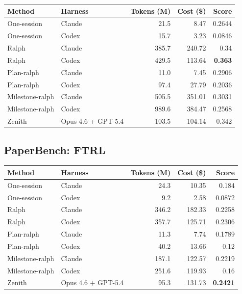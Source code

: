 \documentclass[11pt,a4paper]{article}
\newcommand{\code}[1]{#1}
\begin{document}
\noindent\begin{tabular}{@{}llrrr@{}}
\toprule
\rowcolor{tablehead}\textbf{\color{white}Method} & \textbf{\color{white}Harness} & \textbf{\color{white}Tokens (M)} & \textbf{\color{white}Cost (\$)} & \textbf{\color{white}Score} \\
\midrule
\code{One-session}    & Claude              & 21.5  & 8.47    & 0.2644 \\
\rowcolor{tableband}
\code{One-session}    & Codex               & 15.7  & 3.23    & 0.0846 \\
\code{Ralph}          & Claude              & 385.7 & 240.72  & 0.34 \\
\rowcolor{tableband}
\code{Ralph}          & Codex               & 429.5 & 113.64  & \textbf{0.363} \\
\code{Plan-ralph}     & Claude              & 11.0  & 7.45    & 0.2906 \\
\rowcolor{tableband}
\code{Plan-ralph}     & Codex               & 97.4  & 27.79   & 0.2036 \\
\code{Milestone-ralph}& Claude              & 505.5 & 351.01  & 0.3031 \\
\rowcolor{tableband}
\code{Milestone-ralph}& Codex               & 989.6 & 384.47  & 0.2568 \\
\code{Zenith}         & Opus 4.6 + GPT-5.4  & 103.5 & 104.14  & 0.342 \\
\bottomrule
\end{tabular}

\subsection*{PaperBench: FTRL}

\noindent\begin{tabular}{@{}llrrr@{}}
\toprule
\rowcolor{tablehead}\textbf{\color{white}Method} & \textbf{\color{white}Harness} & \textbf{\color{white}Tokens (M)} & \textbf{\color{white}Cost (\$)} & \textbf{\color{white}Score} \\
\midrule
\code{One-session}    & Claude              & 24.3  & 10.35   & 0.184 \\
\rowcolor{tableband}
\code{One-session}    & Codex               & 9.2   & 2.58    & 0.0872 \\
\code{Ralph}          & Claude              & 346.2 & 182.33  & 0.2258 \\
\rowcolor{tableband}
\code{Ralph}          & Codex               & 357.7 & 125.71  & 0.2306 \\
\code{Plan-ralph}     & Claude              & 11.3  & 7.74    & 0.1789 \\
\rowcolor{tableband}
\code{Plan-ralph}     & Codex               & 40.2  & 13.66   & 0.12 \\
\code{Milestone-ralph}& Claude              & 187.1 & 122.57  & 0.2219 \\
\rowcolor{tableband}
\code{Milestone-ralph}& Codex               & 251.6 & 119.93  & 0.16 \\
\code{Zenith}         & Opus 4.6 + GPT-5.4  & 95.3  & 131.73  & \textbf{0.2421} \\
\bottomrule
\end{tabular}
\end{document}
